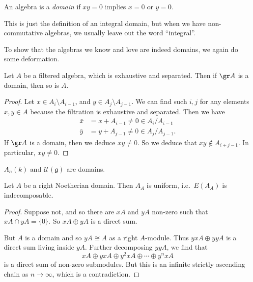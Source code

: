 \documentclass[a4paper]{article}
\begin{document}
\begin{defi}[Domain]
  An algebra is a \emph{domain} if $xy = 0$ implies $x = 0$ or $y = 0$.
\end{defi}
This is just the definition of an integral domain, but when we have non-commutative algebras, we usually leave out the word ``integral''.

To show that the algebras we know and love are indeed domains, we again do some deformation.
\begin{lemma}
  Let $A$ be a filtered algebra, which is exhaustive and separated. Then if $\gr A$ is a domain, then so is $A$.
\end{lemma}

\begin{proof}
  Let $x \in A_i \setminus A_{i - 1}$, and $y \in A_j \setminus A_{j - 1}$. We can find such $i, j$ for any elements $x, y \in A$ because the filtration is exhaustive and separated. Then we have
  \begin{align*}
    \bar{x} &= x + A_{i - 1} \not= 0 \in A_i/A_{i - 1}\\
    \bar{y} &= y + A_{j - 1} \not= 0 \in A_j/A_{j - 1}.
  \end{align*}
  If $\gr A$ is a domain, then we deduce $\bar{x}\bar{y} \not= 0$. So we deduce that $xy \not \in A_{i + j - 1}$. In particular, $xy \not = 0$.
\end{proof}

\begin{cor}
  $A_n(k)$ and $\mathcal{U}(\mathfrak{g})$ are domains.
\end{cor}

\begin{lemma}
  Let $A$ be a right Noetherian domain. Then $A_A$ is uniform, i.e.\ $E(A_A)$ is indecomposable.
\end{lemma}

\begin{proof}
  Suppose not, and so there are $xA$ and $yA$ non-zero such that $xA \cap yA = \{0\}$. So $xA \oplus yA$ is a direct sum.

  But $A$ is a domain and so $yA \cong A$ as a right $A$-module. Thus $yxA \oplus yyA$ is a direct sum living inside $yA$. Further decomposing $yyA$, we find that
  \[
    xA \oplus yx A \oplus y^2 xA \oplus \cdots \oplus y^n xA
  \]
  is a direct sum of non-zero submodules. But this is an infinite strictly ascending chain as $n \to \infty$, which is a contradiction.
\end{proof}
\end{document}
